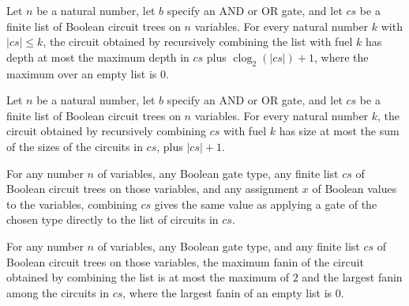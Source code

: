 \begin{theorem}
\label{BoolCircuit.combineFuel_depth}
\leanok
{}
Let $n$ be a natural number, let $b$ specify an AND or OR gate, and let $cs$ be a finite
list of Boolean circuit trees on $n$ variables. For every natural number $k$ with
$|cs|\le k$, the circuit obtained by recursively combining the list with fuel $k$ has
depth at most the maximum depth in $cs$ plus $\operatorname{clog}_2(|cs|)+1$, where the
maximum over an empty list is $0$.
\end{theorem}

\begin{theorem}
\label{BoolCircuit.combineFuel_size}
\leanok
{}
Let $n$ be a natural number, let $b$ specify an AND or OR gate, and let $cs$ be a finite
list of Boolean circuit trees on $n$ variables. For every natural number $k$, the
circuit obtained by recursively combining $cs$ with fuel $k$ has size at most the sum of
the sizes of the circuits in $cs$, plus $|cs|+1$.
\end{theorem}

\begin{theorem}
\label{BoolCircuit.combine_eval}
\leanok
{}
For any number $n$ of variables, any Boolean gate type, any finite list $cs$ of Boolean
circuit trees on those variables, and any assignment $x$ of Boolean values to the
variables, combining $cs$ gives the same value as applying a gate of the chosen type
directly to the list of circuits in $cs$.
\end{theorem}

\begin{theorem}
\label{BoolCircuit.combine_maxFanin}
\leanok
{}
For any number $n$ of variables, any Boolean gate type, and any finite list $cs$ of
Boolean circuit trees on those variables, the maximum fanin of the circuit obtained by
combining the list is at most the maximum of $2$ and the largest fanin among the
circuits in $cs$, where the largest fanin of an empty list is $0$.
\end{theorem}

